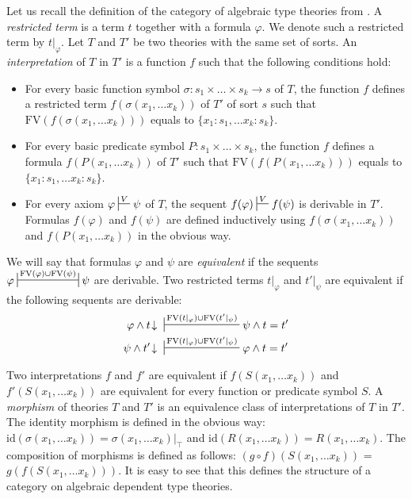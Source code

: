 \documentclass[reqno]{amsart}
\theoremstyle{definition}
\theoremstyle{remark}
\newcommand{\fs}[1]{\mathrm{#1}}
\newcommand{\FV}{\fs{FV}}
\newcommand{\id}{\fs{id}}
\numberwithin{figure}{section}
\begin{document}
Let us recall the definition of the category of algebraic type theories from \cite{alg-tt}.
A \emph{restricted term} is a term $t$ together with a formula $\varphi$.
We denote such a restricted term by $t|_\varphi$.
Let $T$ and $T'$ be two theories with the same set of sorts.
An \emph{interpretation} of $T$ in $T'$ is a function $f$ such that the following conditions hold:
\begin{itemize}
\item For every basic function symbol $\sigma : s_1 \times \ldots \times s_k \to s$ of $T$,
the function $f$ defines a restricted term $f(\sigma(x_1, \ldots x_k))$ of $T'$ of sort $s$ such that $\FV(f(\sigma(x_1, \ldots x_k)))$ equals to $\{ x_1 : s_1, \ldots x_k : s_k \}$.
\item For every basic predicate symbol $P : s_1 \times \ldots \times s_k$,
the function $f$ defines a formula $f(P(x_1, \ldots x_k))$ of $T'$ such that $\FV(f(P(x_1, \ldots x_k)))$ equals to $\{ x_1 : s_1, \ldots x_k : s_k \}$.
\item For every axiom $\varphi \sststile{}{V} \psi$ of $T$, the sequent $f(\varphi) \sststile{}{V} f(\psi)$ is derivable in $T'$.
Formulas $f(\varphi)$ and $f(\psi)$ are defined inductively using $f(\sigma(x_1, \ldots x_k))$ and $f(P(x_1, \ldots x_k))$ in the obvious way.
\end{itemize}

We will say that formulas $\varphi$ and $\psi$ are \emph{equivalent} if the sequents $\varphi \ssststile{}{\FV(\varphi) \cup \FV(\psi)} \psi$ are derivable.
Two restricted terms $t|_\varphi$ and $t'|_\psi$ are equivalent if the following sequents are derivable:
\begin{align*}
\varphi \land t\!\downarrow\ & \sststile{}{\FV(t|_\varphi) \cup \FV(t'|_\psi)} \psi \land t = t' \\
\psi \land t'\!\downarrow\ & \sststile{}{\FV(t|_\varphi) \cup \FV(t'|_\psi)} \varphi \land t = t'
\end{align*}

Two interpretations $f$ and $f'$ are equivalent if $f(S(x_1, \ldots x_k))$ and $f'(S(x_1, \ldots x_k))$ are equivalent for every function or predicate symbol $S$.
A \emph{morphism} of theories $T$ and $T'$ is an equivalence class of interpretations of $T$ in $T'$.
The identity morphism is defined in the obvious way: $\id(\sigma(x_1, \ldots x_k)) = \sigma(x_1, \ldots x_k)|_\top$ and $\id(R(x_1, \ldots x_k)) = R(x_1, \ldots x_k)$.
The composition of morphisms is defined as follows: $(g \circ f)(S(x_1, \ldots x_k))$ = $g(f(S(x_1, \ldots x_k)))$.
It is easy to see that this defines the structure of a category on algebraic dependent type theories.
\end{document}
